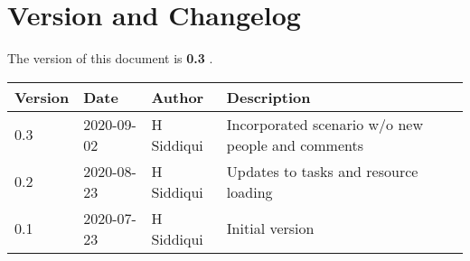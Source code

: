 \section{Version and Changelog}

The version of this document is {\bf 0.3} .

\begin{table}[H]
    \begin{tabular}{|l|l|l|p{10cm}| }
    \hline
    {\bf Version} & {\bf Date} & {\bf Author} & {\bf Description} \\ \hline
    0.3 & 2020-09-02 & H Siddiqui & Incorporated scenario w/o new people and comments\\ \hline
    0.2 & 2020-08-23 & H Siddiqui & Updates to tasks and resource loading \\ \hline
    0.1 & 2020-07-23 & H Siddiqui & Initial version \\ \hline
    \end{tabular}
\end{table}
